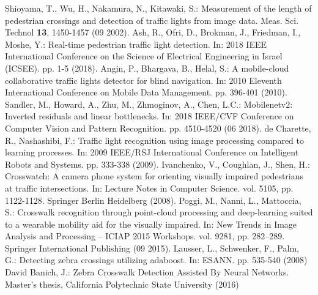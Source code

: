 \documentclass[runningheads]{llncs}
\begin{document}
{\begin{thebibliography}{8}
    Shioyama, T., Wu, H., Nakamura, N., Kitawaki, S.: Measurement of the length of pedestrian crossings and detection of traffic lights from image data. Meas. Sci. Technol \textbf{13}, 1450-1457 (09 2002). 
    Ash, R., Ofri, D., Brokman, J., Friedman, I., Moshe, Y.: Real-time pedestrian traffic light detection. In: 2018 IEEE International Conference on the Science of Electrical Engineering in Israel (ICSEE). pp. 1-5 (2018). 
    Angin, P., Bhargava, B., Helal, S.: A mobile-cloud collaborative traffic lights detector for blind navigation. In: 2010 Eleventh International Conference on Mobile Data Management. pp. 396-401 (2010). 
    Sandler, M., Howard, A., Zhu, M., Zhmoginov, A., Chen, L.C.: Mobilenetv2: Inverted residuals and linear bottlenecks. In: 2018 IEEE/CVF Conference on Computer Vision and Pattern Recognition. pp. 4510-4520 (06 2018). 
    de Charette, R., Nashashibi, F.: Traffic light recognition using image processing compared to learning processes. In: 2009 IEEE/RSJ International Conference on Intelligent Robots and Systems. pp. 333-338 (2009). 
    Ivanchenko, V., Coughlan, J., Shen, H.: Crosswatch: A camera phone system for orienting visually impaired pedestrians at traffic intersections. In: Lecture Notes in Computer Science. vol. 5105, pp. 1122-1128. Springer Berlin Heidelberg (2008). 
    Poggi, M., Nanni, L., Mattoccia, S.: Crosswalk recognition through point-cloud processing and deep-learning suited to a wearable mobility aid for the visually impaired. In: New Trends in Image Analysis and Processing – ICIAP 2015 Workshops. vol. 9281, pp. 282–289. Springer International Publishing (09 2015). 
    Lausser, L., Schwenker, F., Palm, G.: Detecting zebra crossings utilizing adaboost. In: ESANN. pp. 535-540 (2008)
    David Banich, J.: Zebra Crosswalk Detection Assisted By Neural Networks. Master’s thesis, California Polytechnic State University (2016)
\end{thebibliography}
}
\end{document}
